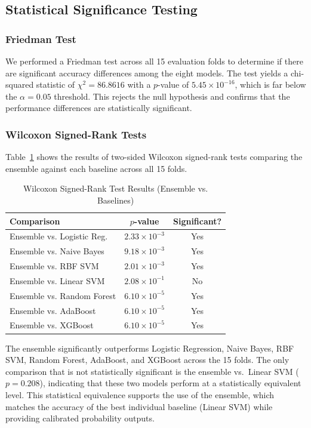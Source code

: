 \documentclass[conference]{IEEEtran}
\begin{document}
\subsection{Statistical Significance Testing}

\subsubsection{Friedman Test}
We performed a Friedman test across all 15 evaluation folds to determine if there are significant accuracy differences among the eight models. The test yields a chi-squared statistic of $\chi^2 = 86.8616$ with a $p$-value of $5.45 \times 10^{-16}$, which is far below the $\alpha = 0.05$ threshold. This rejects the null hypothesis and confirms that the performance differences are statistically significant.

\subsubsection{Wilcoxon Signed-Rank Tests}
Table~\ref{tab:wilcoxon} shows the results of two-sided Wilcoxon signed-rank tests comparing the ensemble against each baseline across all 15 folds.

\begin{table}[htbp]
  \caption{Wilcoxon Signed-Rank Test Results (Ensemble vs. Baselines)}
  \label{tab:wilcoxon}
  \centering
  \small
  \begin{tabular}{lcc}
    \toprule
    \textbf{Comparison} & \textbf{$p$-value} & \textbf{Significant?} \\
    \midrule
    Ensemble vs. Logistic Reg. & $2.33 \times 10^{-3}$ & Yes \\
    Ensemble vs. Naive Bayes   & $9.18 \times 10^{-3}$ & Yes \\
    Ensemble vs. RBF SVM       & $2.01 \times 10^{-3}$ & Yes \\
    Ensemble vs. Linear SVM    & $2.08 \times 10^{-1}$ & No  \\
    Ensemble vs. Random Forest & $6.10 \times 10^{-5}$ & Yes \\
    Ensemble vs. AdaBoost      & $6.10 \times 10^{-5}$ & Yes \\
    Ensemble vs. XGBoost       & $6.10 \times 10^{-5}$ & Yes \\
    \bottomrule
  \end{tabular}
\end{table}

The ensemble significantly outperforms Logistic Regression, Naive Bayes, RBF SVM, Random Forest, AdaBoost, and XGBoost across the 15 folds. The only comparison that is not statistically significant is the ensemble vs.\ Linear SVM ($p = 0.208$), indicating that these two models perform at a statistically equivalent level. This statistical equivalence supports the use of the ensemble, which matches the accuracy of the best individual baseline (Linear SVM) while providing calibrated probability outputs.
\end{document}
